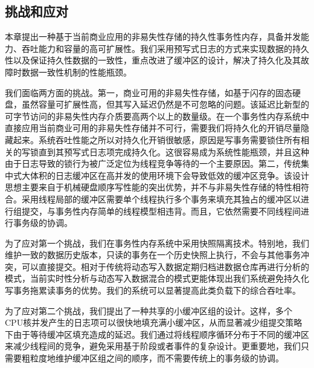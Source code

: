 \subsection{挑战和应对}

本章提出一种基于当前商业应用的非易失性存储的持久性事务性内存，具备并发能力、吞吐能力和容量的高可扩展性。我们采用预写式日志的方式来实现数据的持久性以及保证持久性数据的一致性，重点改进了缓冲区的设计，解决了持久化及其故障时数据一致性机制的性能瓶颈。

我们面临两方面的挑战。第一，商业可用的非易失性存储，如基于闪存的固态硬盘，虽然容量可扩展性高，但其写入延迟仍然是不可忽略的问题。该延迟比新型的可字节访问的非易失性内存介质要高两个以上的数量级。在一个事务性内存系统中直接应用当前商业可用的非易失性存储并不可行，需要我们将持久化的开销尽量隐藏起来。系统吞吐性能之所以对持久化开销很敏感，原因是写事务需要锁住所有相关的写锁直到其预写式日志项完成持久化。这很容易成为系统性能瓶颈\cite{Chen:2009:FEF:1559845.1559855,
Johnson:2010:ASA:1920841.1920928, Johnson:2012:SWL:2205457.2205463,
Zheng:2014:FDF:2685048.2685085}，并且这种由于日志导致的锁行为\cite{Johnson:2010:ASA:1920841.1920928}被广泛定位为线程竞争等待的一个主要原因。第二，传统集中式大体积的日志缓冲区在高并发的使用环境下会导致低效的缓冲区竞争\cite{Johnson:2010:ASA:1920841.1920928,
Huang:2014:NLT:2735496.2735502}。该设计思想主要来自于机械硬盘顺序写性能的突出优势，并不与非易失性存储的特性相符合。采用线程局部的缓冲区\cite{Johnson:2012:SWL:2205457.2205463,
Zheng:2014:FDF:2685048.2685085, Wang:2014:SLT:2732951.2732960}需要单个线程执行多个事务来填充其独占的缓冲区以进行组提交，与事务性内存简单的线程模型相违背。而且，它依然需要不同线程间进行事务级的协调\cite{Johnson:2012:SWL:2205457.2205463,Wang:2014:SLT:2732951.2732960}。

为了应对第一个挑战，我们在事务性内存系统中采用快照隔离技术。特别地，我们维护一致的数据历史版本，只读的事务在一个历史快照上执行，不会与其他事务冲突，可以直接提交。相对于传统将动态写入数据定期归档进数据仓库再进行分析的模式，当前实时性分析与动态写入数据混合的模式\cite{ren2011querying,
Cheng:2012:KTP:2168836.2168846,4302625,Corbett:2012:SGG:2387880.2387905}更能体现出我们系统避免持久化写事务拖累读事务的优势。我们的系统可以显著提高此类负载下的综合吞吐率。

为了应对第二个挑战，我们提出了一种共享的小缓冲区组的设计。这样，多个CPU核并发产生的日志项可以很快地填充满小缓冲区，从而显著减少组提交策略下由于等待缓冲区填充造成的延迟。我们通过将线程顺序循环分布于不同的缓冲区来减少线程间的竞争，避免采用基于阶段或者事件的复杂设计。更重要地，我们只需要粗粒度地维护缓冲区组之间的顺序，而不需要传统上的事务级的协调。


